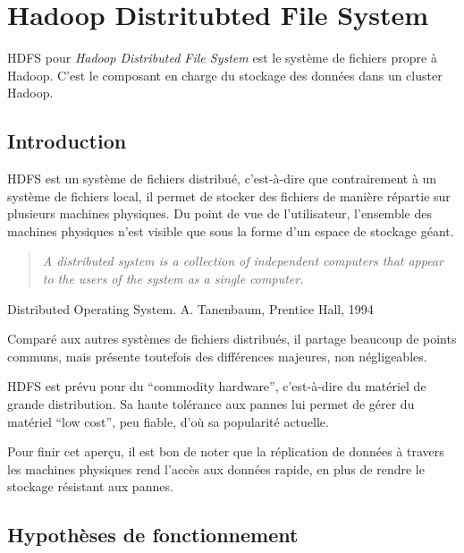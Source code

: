 \section{Hadoop Distritubted File System}
\label{sec:hdfs}
\par HDFS pour \textit{Hadoop Distributed File System} est le système de fichiers propre à Hadoop. C'est le composant en charge du stockage des données dans un cluster Hadoop.

\subsection{Introduction}
\label{sec:introduction}

\par HDFS est un système de fichiers distribué, c'est-à-dire que contrairement à un système de fichiers local, il permet de stocker des fichiers de manière répartie sur plusieurs machines physiques. Du point de vue de l'utilisateur, l'ensemble des machines physiques n'est visible que sous la forme d'un espace de stockage géant. 

\begin{quote}
  \emph{A distributed system is a collection of independent computers that appear to the users of the system as a single computer.}
\end{quote}

\begin{flushright}
  Distributed Operating System. A. Tanenbaum, Prentice 
  Hall, 1994
\end{flushright}

\par Comparé aux autres systèmes de fichiers distribués, il partage beaucoup de points communs, mais présente toutefois des différences majeures, non négligeables.

\par HDFS est prévu pour du ``commodity hardware'', c'est-à-dire du matériel de grande distribution. Sa haute tolérance aux pannes lui permet de gérer du matériel ``low cost'', peu fiable, d'où sa popularité actuelle.

\par Pour finir cet aperçu, il est bon de noter que la réplication de données à travers les machines physiques rend l'accès aux données rapide, en plus de rendre le stockage résistant aux pannes.   

\subsection{Hypothèses de fonctionnement}
\label{sec:hypoth-de-fonct}

